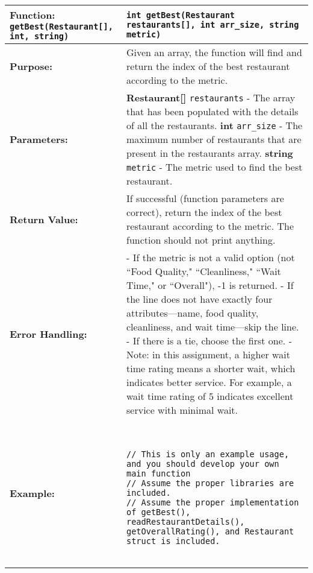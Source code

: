 \begin{longtable}{|p{1.7in}|p{4.3in}|}
\hline
\textbf{Function:}  \texttt{getBest(Restaurant[], int, string)} 
& \texttt{int getBest(Restaurant restaurants[], int arr_size, string metric)} \newline
 \\ \hline

\textbf{Purpose:} & Given an array, the function will find and return the index of the best restaurant according to the metric. \\ \hline

\textbf{Parameters:} & 
\textbf{Restaurant[]} \texttt{restaurants} - The array that has been populated with the details of all the restaurants. \newline
\textbf{int} \texttt{arr\_size} - The maximum number of restaurants that are present in the restaurants array. \newline
\textbf{string} \texttt{metric} - The metric used to find the best restaurant. 
\\ \hline

\textbf{Return Value:} & 
If successful (function parameters are correct), return the index of the best restaurant according to the metric. The function should not print anything.
\\ \hline

\textbf{Error Handling:} & 
- If the metric is not a valid option (not ``Food Quality," ``Cleanliness," ``Wait Time," or ``Overall"), -1 is returned. \newline
- If the line does not have exactly four attributes—name, food quality, cleanliness, and wait time—skip the line. \newline
- If there is a tie, choose the first one.  \newline
- Note: in this assignment, a higher wait time rating means a shorter wait, which indicates better service. For example, a wait time rating of 5 indicates excellent service with minimal wait. 
\\ \hline

\textbf{Example:} & 
\begin{example}
\begin{verbatim}


// This is only an example usage, and you should develop your own main function
// Assume the proper libraries are included.
// Assume the proper implementation of getBest(), readRestaurantDetails(), getOverallRating(), and Restaurant struct is included.


\end{verbatim}
\end{example}
\end{longtable}

